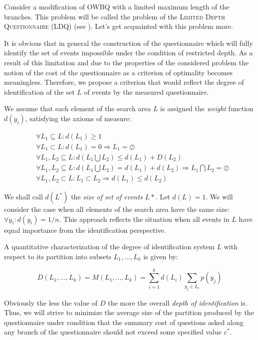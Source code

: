 \documentclass[11pt]{article}
\begin{document}
Consider a modification of OWBQ with a limited maximum length of the branches. This problem will be called the problem of the \textsc{Limited Depth Questionnaire} (LDQ) (see \cite{ArBo:ddv}). Let's get acquainted with this problem more.

It is obvious that in general the construction of the questionnaire which will fully identify the set of events impossible under the condition of restricted depth. As a result of this limitation and due to the properties of the considered problem the notion of the cost of the questionnaire as a criterion of optimality becomes meaningless. Therefore, we propose a criterion that would reflect the degree of identification of the set $L$ of events by the measured questionnaire.

We assume that each element of the search area $ L $ is assigned the \emph{weight} function $d(y_i)$, satisfying  the axioms of measure:

\begin{equation}
\begin{split}
&\forall L_1\subseteq L : d(L_1) \geq 1 \\
&\forall L_1\subset L : d(L_1)=0 \Rightarrow L_1 = \oslash \\
&\forall L_1, L_2 \subseteq L : d(L_1 \bigcup L_2) \leq d(L_1) + D(L_2) \\
&\forall L_1, L_2 \subseteq L : d(L_1 \bigcup L_2) = d(L_1) + d(L_2) \Rightarrow L_1 \bigcap L_2 = \oslash \\
&\forall L_1, L_2 \subset L : L_1 \subset L_2 \Rightarrow d(L_1) \le d(L_2) \label{eq:2} 
\end{split}
\end{equation}

We shall call $d(L^*)$ the \emph{size of set of events} $L*$. Let $d(L)=1$. We will consider the case when all elements of the search area have the same size: $\forall y_i:d(y_i)=1/n$. This approach reflects the situation when all events in $L$ have equal importance from the identification perspective.

A quantitative characterization of the degree of identification system $L$ with respect to its partition into subsets $L_1,...,L_k$ is given by:

\begin{equation}
D(L_1,...,L_k)=M(L_1,...,L_k)=\sum_{i=1}^kd(L_i)\sum_{y_j\in L_i}p(y_j) \label{eq:3}
\end{equation}

Obviously the less the value of $D$ the more the overall \emph{depth of identification} is. Thus, we will strive to minimize the average size of the partition produced by the questionnaire under condition that the summary cost of questions asked along any branch of the questionnaire should not exceed some specified value $c^*$.
\end{document}
